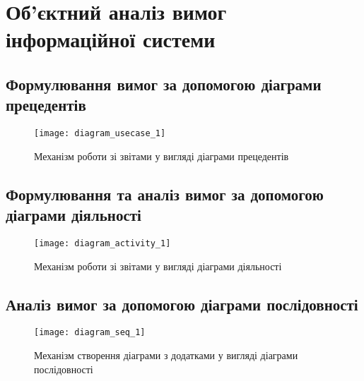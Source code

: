 \documentclass[../main.tex]{subfiles}
\begin{document}
\section{Об'єктний аналіз вимог інформаційної системи}

\subsection{Формулювання вимог за допомогою діаграми прецедентів}
\begin{figure}[H]
\centering
\texttt{[image: diagram\_usecase\_1]}
\caption{Механізм роботи зі звітами у вигляді діаграми прецедентів}
\end{figure}

\subsection{Формулювання та аналіз вимог за допомогою діаграми діяльності}
\begin{figure}[H]
\centering
\texttt{[image: diagram\_activity\_1]}
\caption{Механізм роботи зі звітами у вигляді діаграми діяльності}
\end{figure}


\subsection{Аналіз вимог за допомогою діаграми послідовності}
\begin{figure}[H]
	\centering
	\texttt{[image: diagram\_seq\_1]}
	\caption{Механізм створення діаграми з додатками у вигляді діаграми послідовності}
\end{figure}


\end{document}
